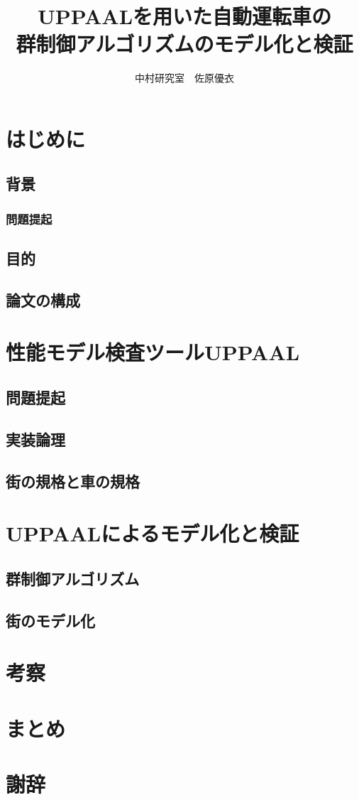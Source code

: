 \documentclass{jsreport}
\title{UPPAALを用いた自動運転車の\\群制御アルゴリズムのモデル化と検証}
\author{中村研究室　佐原優衣}
\begin{document}
\maketitle
\tableofcontents
\clearpage
\chapter{はじめに}
	\section{背景}
		\subsection{問題提起}
	\section{目的}
	\section{論文の構成}
\chapter{性能モデル検査ツールUPPAAL}
	\section{問題提起}
	\section{実装論理}
	\section{街の規格と車の規格}
\chapter{UPPAALによるモデル化と検証}
	\section{群制御アルゴリズム}
	\section{街のモデル化}
\chapter{考察}
\chapter{まとめ}
\chapter*{謝辞}
\end{document}
